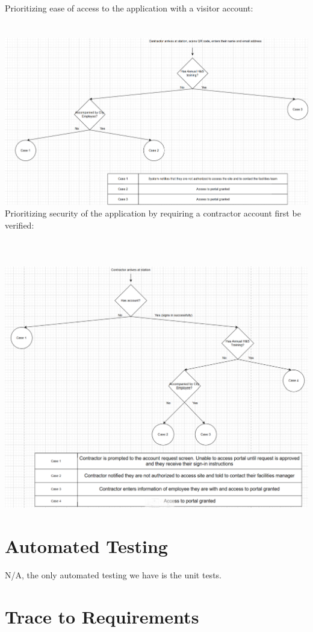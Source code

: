 \documentclass[12pt, titlepage]{article}
\begin{document}
Prioritizing ease of access to the application with a visitor account:\\
\\
\\
\includegraphics[scale=0.7]{ease_of_access.png}
\newpage
Prioritizing security of the application by requiring a contractor account first be verified:\\
\\
\\
\\
\includegraphics[scale=0.7]{trusted_access.png}
\newpage
\section{Automated Testing}
N/A, the only automated testing we have is the unit tests.

\section{Trace to Requirements}
\end{document}
